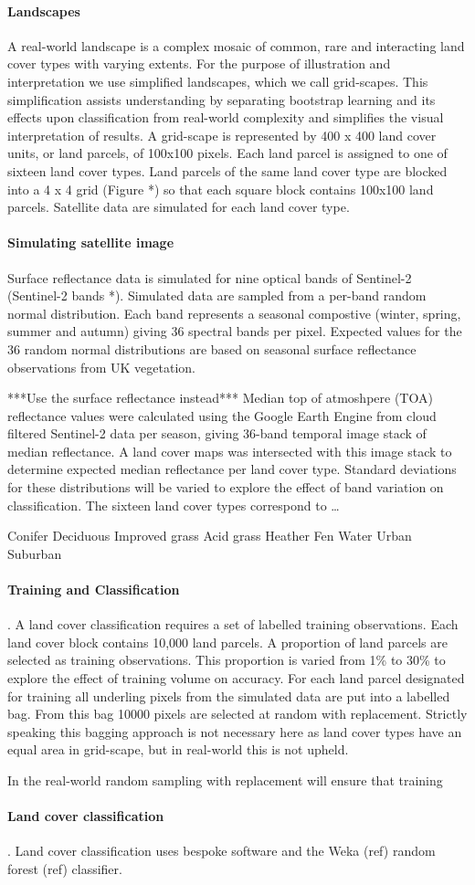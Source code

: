 \paragraph{Landscapes}
A real-world landscape is a complex mosaic of common, rare and interacting land cover types with varying extents.  For the purpose of illustration and interpretation we use simplified landscapes, which we call grid-scapes. This simplification assists understanding by separating bootstrap learning and its effects upon classification from real-world complexity and simplifies the visual interpretation of results. A grid-scape is represented by 400 x 400 land cover units, or land parcels, of 100x100 pixels.  Each land parcel is assigned to one of sixteen land cover types.  Land parcels of the same land cover type are blocked into a 4 x 4 grid (Figure *) so that each square block contains 100x100 land parcels.  Satellite data are simulated for each land cover type.


\paragraph{Simulating satellite image}
Surface reflectance data is simulated for nine optical bands of Sentinel-2 (Sentinel-2 bands  *).  Simulated data are sampled from a per-band random normal distribution.  Each band represents a seasonal compostive (winter, spring, summer and autumn) giving 36 spectral bands per pixel.  Expected values for the 36 random normal distributions are based on seasonal surface reflectance observations from UK vegetation.  

***Use the surface reflectance instead*** Median top of atmoshpere (TOA) reflectance values were calculated using the Google Earth Engine from cloud filtered Sentinel-2 data per season, giving 36-band temporal image stack of median reflectance.  A land cover maps was intersected with this image stack to determine expected median reflectance per land cover type. Standard deviations for these distributions will be varied to explore the effect of band variation on classification. The sixteen land cover types correspond to \ldots


Conifer
Deciduous
Improved grass
Acid grass
Heather
Fen
Water
Urban
Suburban



\paragraph{Training and Classification}.  A land cover classification requires a set of labelled training observations. Each land cover block contains 10,000 land parcels.  A proportion of land parcels are selected as training observations.  This proportion is varied from 1\% to 30\% to explore the effect of training volume on accuracy.  For each land parcel designated for training all underling pixels from the simulated data are put into a labelled bag.  From this bag 10000 pixels are selected at random with replacement.  Strictly speaking this bagging approach is not necessary here as land cover types have an equal area in grid-scape, but in real-world this is not upheld.  

In the real-world random sampling with replacement will ensure that training 

\paragraph{Land cover classification}.  Land cover classification uses bespoke software and the Weka (ref) random forest (ref) classifier.  
 